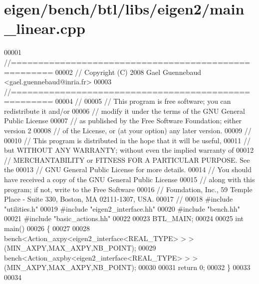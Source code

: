 \hypertarget{eigen_2bench_2btl_2libs_2eigen2_2main__linear_8cpp_source}{}\section{eigen/bench/btl/libs/eigen2/main\+\_\+linear.cpp}
\label{eigen_2bench_2btl_2libs_2eigen2_2main__linear_8cpp_source}

\begin{DoxyCode}
00001 \textcolor{comment}{//=====================================================}
00002 \textcolor{comment}{// Copyright (C) 2008 Gael Guennebaud <gael.guennebaud@inria.fr>}
00003 \textcolor{comment}{//=====================================================}
00004 \textcolor{comment}{//}
00005 \textcolor{comment}{// This program is free software; you can redistribute it and/or}
00006 \textcolor{comment}{// modify it under the terms of the GNU General Public License}
00007 \textcolor{comment}{// as published by the Free Software Foundation; either version 2}
00008 \textcolor{comment}{// of the License, or (at your option) any later version.}
00009 \textcolor{comment}{//}
00010 \textcolor{comment}{// This program is distributed in the hope that it will be useful,}
00011 \textcolor{comment}{// but WITHOUT ANY WARRANTY; without even the implied warranty of}
00012 \textcolor{comment}{// MERCHANTABILITY or FITNESS FOR A PARTICULAR PURPOSE.  See the}
00013 \textcolor{comment}{// GNU General Public License for more details.}
00014 \textcolor{comment}{// You should have received a copy of the GNU General Public License}
00015 \textcolor{comment}{// along with this program; if not, write to the Free Software}
00016 \textcolor{comment}{// Foundation, Inc., 59 Temple Place - Suite 330, Boston, MA  02111-1307, USA.}
00017 \textcolor{comment}{//}
00018 \textcolor{preprocessor}{#include "utilities.h"}
00019 \textcolor{preprocessor}{#include "eigen2\_interface.hh"}
00020 \textcolor{preprocessor}{#include "bench.hh"}
00021 \textcolor{preprocessor}{#include "basic\_actions.hh"}
00022 
00023 BTL\_MAIN;
00024 
00025 \textcolor{keywordtype}{int} main()
00026 \{
00027 
00028   bench<Action\_axpy<eigen2\_interface<REAL\_TYPE> > >(MIN\_AXPY,MAX\_AXPY,NB\_POINT);
00029   bench<Action\_axpby<eigen2\_interface<REAL\_TYPE> > >(MIN\_AXPY,MAX\_AXPY,NB\_POINT);
00030   
00031   \textcolor{keywordflow}{return} 0;
00032 \}
00033 
00034 
\end{DoxyCode}
